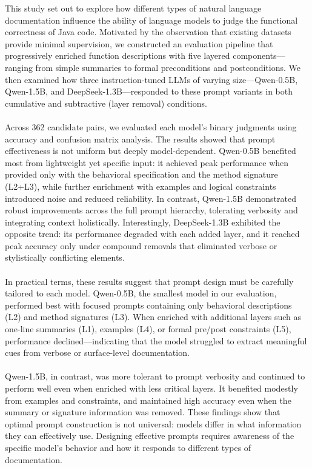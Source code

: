 \documentclass[a4paper]{usiinfbachelorproject}
\begin{document}
This study set out to explore how different types of natural language documentation influence the ability of language models to judge the functional correctness of Java code. Motivated by the observation that existing datasets provide minimal supervision, we constructed an evaluation pipeline that progressively enriched function descriptions with five layered components—ranging from simple summaries to formal preconditions and postconditions. We then examined how three instruction-tuned LLMs of varying size—Qwen-0.5B, Qwen-1.5B, and DeepSeek-1.3B—responded to these prompt variants in both cumulative and subtractive (layer removal) conditions. \\
\\
Across 362 candidate pairs, we evaluated each model’s binary judgments using accuracy and confusion matrix analysis. The results showed that prompt effectiveness is not uniform but deeply model-dependent. Qwen-0.5B benefited most from lightweight yet specific input: it achieved peak performance when provided only with the behavioral specification and the method signature (L2+L3), while further enrichment with examples and logical constraints introduced noise and reduced reliability. In contrast, Qwen-1.5B demonstrated robust improvements across the full prompt hierarchy, tolerating verbosity and integrating context holistically. Interestingly, DeepSeek-1.3B exhibited the opposite trend: its performance degraded with each added layer, and it reached peak accuracy only under compound removals that eliminated verbose or stylistically conflicting elements. \\
\\
In practical terms, these results suggest that prompt design must be carefully tailored to each model. Qwen-0.5B, the smallest model in our evaluation, performed best with focused prompts containing only behavioral descriptions (L2) and method signatures (L3). When enriched with additional layers such as one-line summaries (L1), examples (L4), or formal pre/post constraints (L5), performance declined—indicating that the model struggled to extract meaningful cues from verbose or surface-level documentation.\\
\\
Qwen-1.5B, in contrast, was more tolerant to prompt verbosity and continued to perform well even when enriched with less critical layers. It benefited modestly from examples and constraints, and maintained high accuracy even when the summary or signature information was removed. These findings show that optimal prompt construction is not universal: models differ in what information they can effectively use. Designing effective prompts requires awareness of the specific model’s behavior and how it responds to different types of documentation.
\end{document}
